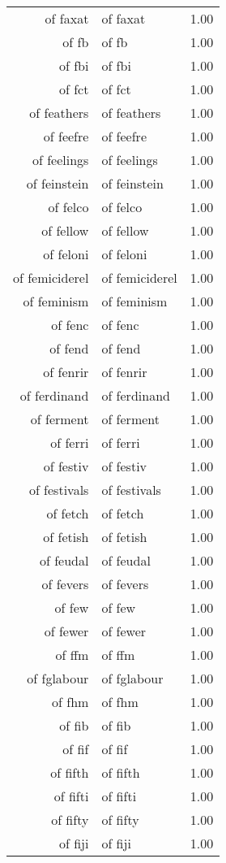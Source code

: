 \begin{table}[ht]
\begin{tabular}{rlr}
  of faxat & of faxat & 1.00 \\ 
  of fb & of fb & 1.00 \\ 
  of fbi & of fbi & 1.00 \\ 
  of fct & of fct & 1.00 \\ 
  of feathers & of feathers & 1.00 \\ 
  of feefre & of feefre & 1.00 \\ 
  of feelings & of feelings & 1.00 \\ 
  of feinstein & of feinstein & 1.00 \\ 
  of felco & of felco & 1.00 \\ 
  of fellow & of fellow & 1.00 \\ 
  of feloni & of feloni & 1.00 \\ 
  of femiciderel & of femiciderel & 1.00 \\ 
  of feminism & of feminism & 1.00 \\ 
  of fenc & of fenc & 1.00 \\ 
  of fend & of fend & 1.00 \\ 
  of fenrir & of fenrir & 1.00 \\ 
  of ferdinand & of ferdinand & 1.00 \\ 
  of ferment & of ferment & 1.00 \\ 
  of ferri & of ferri & 1.00 \\ 
  of festiv & of festiv & 1.00 \\ 
  of festivals & of festivals & 1.00 \\ 
  of fetch & of fetch & 1.00 \\ 
  of fetish & of fetish & 1.00 \\ 
  of feudal & of feudal & 1.00 \\ 
  of fevers & of fevers & 1.00 \\ 
  of few & of few & 1.00 \\ 
  of fewer & of fewer & 1.00 \\ 
  of ffm & of ffm & 1.00 \\ 
  of fglabour & of fglabour & 1.00 \\ 
  of fhm & of fhm & 1.00 \\ 
  of fib & of fib & 1.00 \\ 
  of fif & of fif & 1.00 \\ 
  of fifth & of fifth & 1.00 \\ 
  of fifti & of fifti & 1.00 \\ 
  of fifty & of fifty & 1.00 \\ 
  of fiji & of fiji & 1.00 \\ 

\end{tabular}
\end{table}
